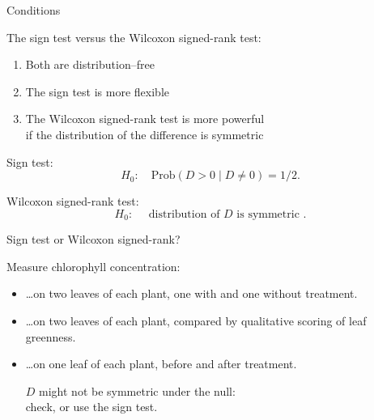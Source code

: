 \begin{frame}{Conditions}

  The sign test versus the Wilcoxon signed-rank test:
  \begin{enumerate}
    \item Both are distribution--free
    \item The sign test is \alert{more flexible} 
    \item The Wilcoxon signed-rank test is \alert{more powerful} \\
        if the distribution of the difference is symmetric
  \end{enumerate}

    \vspace{2em}

    Sign test:
    \[ H_0: \quad \mbox{Prob}(D>0\;|\;D\neq 0) = 1/2 . \]

    \vspace{2em}

    Wilcoxon signed-rank test:
    \[ H_0: \quad \text{ distribution of $D$ is symmetric } .\]

\end{frame}

\begin{frame}{Sign test or Wilcoxon signed-rank?}

  Measure chlorophyll concentration:

  \begin{itemize}

    \item \ldots on two leaves of each plant, one with and one without treatment.
      \pause


    \item \ldots on two leaves of each plant, compared by qualitative scoring of leaf greenness.
      \pause


    \item \ldots on one leaf of each plant, before and after treatment.
      \pause

      \alert{$D$ might not be symmetric under the null:} \\
      check, or use the sign test.

  \end{itemize}

\end{frame}

